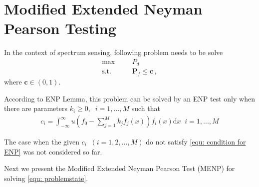 
\section{Modified Extended Neyman Pearson Testing}

\def \JUDGEMENT{u(f_0(x) - \sum_{j=1}^{M}k_j f_j(x))}

In the context of spectrum sensing, following problem needs to be solve
      \begin{equation}
      \label{equ: problemstate}
      \begin{split}
      \max\;\;\;\;\;\;&P_d\\
      \text{s.t.}\;\;\;\;\;\;&\mathbf{P}_f \leq \mathbf{c}\,,
      \end{split}
      \end{equation}
where $\mathbf{c} \in (0, 1)$.

According to ENP Lemma, this problem can be solved by an ENP test only when there are parameters $k_i \geq 0, \;\;i=1, ..., M$ such that 
\begin{equation}
\label{equ: condition for ENP}
\begin{split}
c_i = \int_{-\infty}^{\infty}u(f_0 - \sum_{j=1}^{M}k_jf_j(x))f_i(x)\mathrm{d}x \;\;i = 1, ..., M
\end{split}
\end{equation}

The case when the given $c_i\;\; (i= 1, 2, ..., M)$ do not satisfy \eqref{equ: condition for ENP} was not considered so far. 

Next we present the Modified Extended Neyman Pearson Test (MENP) for solving \eqref{equ: problemstate}.

